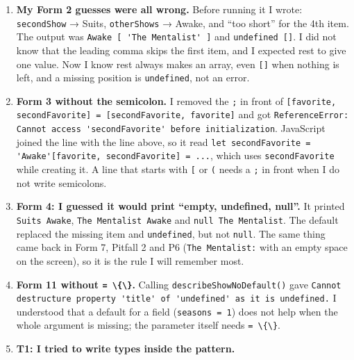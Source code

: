 \documentclass[
  10pt,
]{article}
\newcommand{\passthrough}[1]{#1}
\begin{document}
\begin{enumerate}
\def\labelenumi{\arabic{enumi}.}
\item
  \textbf{My Form 2 guesses were all wrong.} Before running it I wrote:
  \passthrough{\lstinline!secondShow!} → Suits,
  \passthrough{\lstinline!otherShows!} → Awake, and ``too short'' for
  the 4th item. The output was
  \passthrough{\lstinline!Awake [ 'The Mentalist' ]!} and
  \passthrough{\lstinline!undefined []!}. I did not know that the
  leading comma skips the first item, and I expected rest to give one
  value. Now I know rest always makes an array, even
  \passthrough{\lstinline![]!} when nothing is left, and a missing
  position is \passthrough{\lstinline!undefined!}, not an error.
\item
  \textbf{Form 3 without the semicolon.} I removed the
  \passthrough{\lstinline!;!} in front of
  \passthrough{\lstinline![favorite, secondFavorite] = [secondFavorite, favorite]!}
  and got
  \passthrough{\lstinline!ReferenceError: Cannot access 'secondFavorite' before initialization!}.
  JavaScript joined the line with the line above, so it read
  \passthrough{\lstinline!let secondFavorite = 'Awake'[favorite, secondFavorite] = ...!},
  which uses \passthrough{\lstinline!secondFavorite!} while creating it.
  A line that starts with \passthrough{\lstinline![!} or
  \passthrough{\lstinline!(!} needs a \passthrough{\lstinline!;!} in
  front when I do not write semicolons.
\item
  \textbf{Form 4: I guessed it would print ``empty, undefined, null''.}
  It printed \passthrough{\lstinline!Suits Awake!},
  \passthrough{\lstinline!The Mentalist Awake!} and
  \passthrough{\lstinline!null The Mentalist!}. The default replaced the
  missing item and \passthrough{\lstinline!undefined!}, but not
  \passthrough{\lstinline!null!}. The same thing came back in Form 7,
  Pitfall 2 and P6 (\passthrough{\lstinline!The Mentalist:!} with an
  empty space on the screen), so it is the rule I will remember most.
\item
  \textbf{Form 11 without \passthrough{\lstinline!= \{\}!}.} Calling
  \passthrough{\lstinline!describeShowNoDefault()!} gave
  \passthrough{\lstinline!Cannot destructure property 'title' of 'undefined' as it is undefined.!}
  I understood that a default for a field
  (\passthrough{\lstinline!seasons = 1!}) does not help when the whole
  argument is missing; the parameter itself needs
  \passthrough{\lstinline!= \{\}!}.
\item
  \textbf{T1: I tried to write types inside the pattern.}

\end{enumerate}
\end{document}
